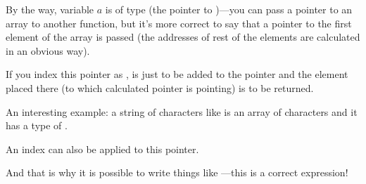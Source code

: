 

By the way, variable $a$ is of type   
(the pointer to \Tint{})---you can pass a pointer to an array to another function,
but it's more correct to say that a pointer to the first element of the array is passed
(the addresses of rest of the elements are calculated in an obvious way).

If you index this pointer as ,  is just to be added to the pointer 
and the element placed there (to which calculated pointer is pointing) is to be returned.

An interesting example: a string of characters like 
 is an array of characters and it has a type of .

An index can also be applied to this pointer.

And that is why it is possible to write things like ---this is a correct \CCpp expression!

